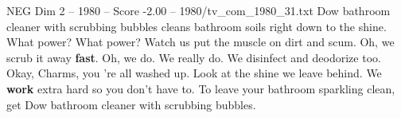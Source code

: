 \begin{textsample}{NEG Dim 2 – 1980 – Score -2.00 – 1980/tv\_com\_1980\_31.txt}  \label{ex:f2_neg_024}
Dow bathroom cleaner with scrubbing bubbles cleans bathroom soils right down to the shine.
What power?
What power?
Watch us put the muscle on dirt and scum.
Oh, we scrub it away \textbf{fast}.
Oh, we do.
We really do.
We disinfect and deodorize too.
Okay, Charms, you 're all washed up.
Look at the shine we leave behind.
We \textbf{work} extra hard so you don't have to.
To leave your bathroom sparkling clean, get Dow bathroom cleaner with scrubbing bubbles.

\end{textsample}
